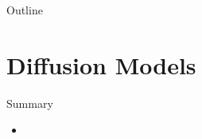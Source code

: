 

\begin{frame}
\titlepage
\end{frame}
\begin{frame}{Outline}
	\tableofcontents
\end{frame}
\section{Diffusion Models}
\begin{frame}{Summary}
	\begin{itemize}
		\item
	\end{itemize}
\end{frame}
 